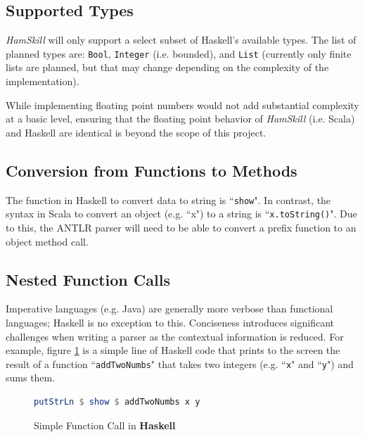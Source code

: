 \documentclass{report}
\begin{document}
\subsection{Supported Types}\label{sec:supportedTypes}

\emph{HamSkill} will only support a select subset of Haskell's available types.  The list of planned types are: {\tt Bool}, {\tt Integer} (i.e. bounded), and {\tt List} (currently only finite lists are planned, but that may change depending on the complexity of the implementation).

While implementing floating point numbers would not add substantial complexity at a basic level, ensuring that the floating point behavior of \emph{HamSkill} (i.e. Scala) and Haskell are identical is beyond the scope of this project.


\subsection{Conversion from Functions to Methods}

The function in Haskell to convert data to string is ``{\tt show}". In contrast, the syntax in Scala to convert an object (e.g. ``x") to a string is ``{\tt x.toString()}".  Due to this, the ANTLR parser will need to be able to convert a prefix function to an object method call.

\subsection{Nested Function Calls}\label{sec:nestedFunctionCalls}

Imperative languages (e.g. Java) are generally more verbose than functional languages; Haskell is no exception to this.  Conciseness introduces significant challenges when writing a parser as the contextual information is reduced.  For example, figure \ref{fig:addTwoNumbersHaskell} is a simple line of Haskell code that prints to the screen the result of a function ``{\tt addTwoNumbs}" that takes two integers (e.g. ``{\tt x}" and ``{\tt y}") and sums them. 

\begin{figure}[H]
\begin{mdframed}
\begin{lstlisting}[language=Haskell]
putStrLn $ show $ addTwoNumbs x y
\end{lstlisting}
\end{mdframed}
\caption{Simple Function Call in \textbf{Haskell}}\label{fig:addTwoNumbersHaskell}
\end{figure}
\end{document}
